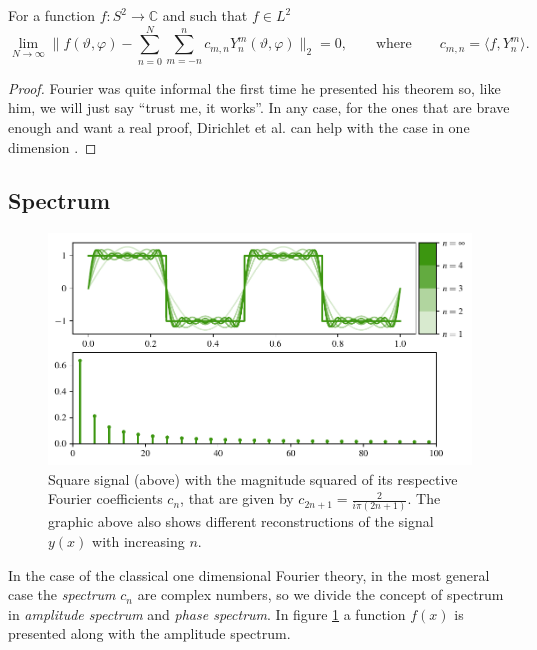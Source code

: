 \begin{theorem}
  \label{kugel:thm:fourier-s2}
  For a function $f: S^2 \to \mathbb{C}$ and such that $f \in L^2$
  \begin{equation*}
    \lim_{N \to \infty}
    \biggl\|
      f(\vartheta,\varphi)
      - \sum_{n=0}^N\sum_{m=-n}^n c_{m,n} Y^m_n(\vartheta,\varphi)
    \biggr\|_2 = 0,
    \qquad\text{where}\qquad
    c_{m,n} = \langle f, Y^m_n \rangle.
  \end{equation*}
\end{theorem}
\begin{proof}
  Fourier was quite informal the first time he presented his theorem so, like
  him, we will just say ``trust me, it works''. In any case, for the ones that
  are brave enough and want a real proof, Dirichlet et al. can help with the
  case in one dimension \cite{convergence_fourier}.
\end{proof}

\subsection{Spectrum}
\label{kugel:sec:spectrum}

\begin{figure}
  \centering
  \includegraphics[width=.95\textwidth]{papers/kugel/figures/python/1D-fourier.pdf}
  \caption{
    Square signal (above) with the magnitude squared of its respective Fourier
    coefficients $c_n$, that are given by $c_{2n+1}=\frac{2}{i\pi(2n+1)}$. The
    graphic above also shows different reconstructions of the signal $y(x)$ with
    increasing $n$.
    \label{kugel:fig:1d-fourier}
  }
\end{figure}

 In the case of the classical one dimensional Fourier theory, in the most
 general case the \emph{spectrum} $c_n$ are complex numbers, so we divide the
 concept of spectrum in \emph{amplitude spectrum} and \emph{phase spectrum}. In
 figure \ref{kugel:fig:1d-fourier} a function $f(x)$ is presented along with the
 amplitude spectrum.

